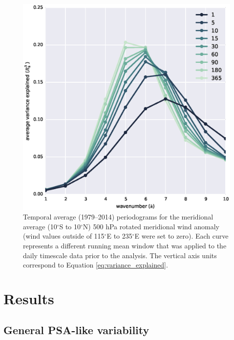 \begin{figure}
\begin{center}
\includegraphics[width=0.7\columnwidth]{figures/psa/vrot-r2spectrum_ERAInterim_500hPa_daily-anom-wrt-all_native-np20N260E.eps}
\caption[Temporal average (1979--2014) periodograms for the meridional average (10$^{\circ}$S to 10$^{\circ}$N) 500 hPa rotated meridional wind anomaly]{\label{fig:periodogram}
Temporal average (1979--2014) periodograms for the meridional average (10$^{\circ}$S to 10$^{\circ}$N) 500 hPa rotated meridional wind anomaly (wind values outside of 115$^{\circ}$E to 235$^{\circ}$E were set to zero). Each curve represents a different running mean window that was applied to the daily timescale data prior to the analysis. The vertical axis units correspond to Equation \ref{eq:variance_explained}.%
}
\end{center}
\end{figure}



\section{Results}

\subsection{General PSA-like variability}

